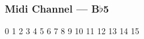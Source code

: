 \subsubsection{Midi Channel --- B$\flat$5}









































0
1
2
3
4
5
6
7
8
9
10
11
12
13
14
15

